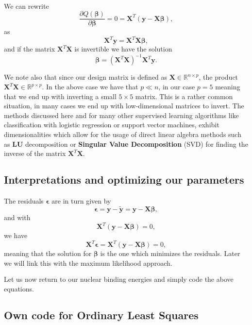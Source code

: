 \documentclass[%
oneside,                 %
final,                   %
10pt]{article}
\begin{document}
\paragraph{}
We can rewrite
\[
\frac{\partial Q(\bm{\beta})}{\partial \bm{\beta}} = 0 = \bm{X}^T\left( \bm{y}-\bm{X}\bm{\beta}\right),  
\]
as
\[
\bm{X}^T\bm{y} = \bm{X}^T\bm{X}\bm{\beta},  
\]
and if the matrix $\bm{X}^T\bm{X}$ is invertible we have the solution
\[
\bm{\beta} =\left(\bm{X}^T\bm{X}\right)^{-1}\bm{X}^T\bm{y}.
\]

We note also that since our design matrix is defined as $\bm{X}\in
{\mathbb{R}}^{n\times p}$, the product $\bm{X}^T\bm{X} \in
{\mathbb{R}}^{p\times p}$.  In the above case we have that $p \ll n$,
in our case $p=5$ meaning that we end up with inverting a small
$5\times 5$ matrix. This is a rather common situation, in many cases we end up with low-dimensional
matrices to invert. The methods discussed here and for many other
supervised learning algorithms like classification with logistic
regression or support vector machines, exhibit dimensionalities which
allow for the usage of direct linear algebra methods such as \textbf{LU} decomposition or \textbf{Singular Value Decomposition} (SVD) for finding the inverse of the matrix
$\bm{X}^T\bm{X}$.



\subsection{Interpretations and optimizing our parameters}

\paragraph{}
The residuals $\bm{\epsilon}$ are in turn given by
\[
\bm{\epsilon} = \bm{y}-\bm{\tilde{y}} = \bm{y}-\bm{X}\bm{\beta},
\]
and with 
\[
\bm{X}^T\left( \bm{y}-\bm{X}\bm{\beta}\right)= 0, 
\]
we have
\[
\bm{X}^T\bm{\epsilon}=\bm{X}^T\left( \bm{y}-\bm{X}\bm{\beta}\right)= 0, 
\]
meaning that the solution for $\bm{\beta}$ is the one which minimizes the residuals.  Later we will link this with the maximum likelihood approach.




Let us now return to our nuclear binding energies and simply code the above equations. 

\subsection{Own code for Ordinary Least Squares}
\end{document}
